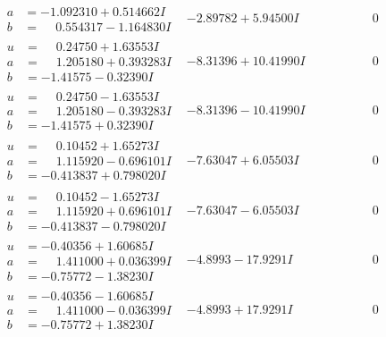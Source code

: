 \documentclass[1p]{elsarticle_modified}
\theoremstyle{definition}
\begin{document}
$$\begin{array}{c|c|c}
\begin{aligned}
a &= -1.092310 + 0.514662 I \\
b &= \phantom{-}0.554317 - 1.164830 I\end{aligned}
 & -2.89782 + 5.94500 I & \phantom{-0.000000 } 0 \\ \hline\begin{aligned}
u &= \phantom{-}0.24750 + 1.63553 I \\
a &= \phantom{-}1.205180 + 0.393283 I \\
b &= -1.41575 - 0.32390 I\end{aligned}
 & -8.31396 + 10.41990 I & \phantom{-0.000000 } 0 \\ \hline\begin{aligned}
u &= \phantom{-}0.24750 - 1.63553 I \\
a &= \phantom{-}1.205180 - 0.393283 I \\
b &= -1.41575 + 0.32390 I\end{aligned}
 & -8.31396 - 10.41990 I & \phantom{-0.000000 } 0 \\ \hline\begin{aligned}
u &= \phantom{-}0.10452 + 1.65273 I \\
a &= \phantom{-}1.115920 - 0.696101 I \\
b &= -0.413837 + 0.798020 I\end{aligned}
 & -7.63047 + 6.05503 I & \phantom{-0.000000 } 0 \\ \hline\begin{aligned}
u &= \phantom{-}0.10452 - 1.65273 I \\
a &= \phantom{-}1.115920 + 0.696101 I \\
b &= -0.413837 - 0.798020 I\end{aligned}
 & -7.63047 - 6.05503 I & \phantom{-0.000000 } 0 \\ \hline\begin{aligned}
u &= -0.40356 + 1.60685 I \\
a &= \phantom{-}1.411000 + 0.036399 I \\
b &= -0.75772 - 1.38230 I\end{aligned}
 & -4.8993 - 17.9291 I & \phantom{-0.000000 } 0 \\ \hline\begin{aligned}
u &= -0.40356 - 1.60685 I \\
a &= \phantom{-}1.411000 - 0.036399 I \\
b &= -0.75772 + 1.38230 I\end{aligned}
 & -4.8993 + 17.9291 I & \phantom{-0.000000 } 0 \\ \hline\begin{aligned}

\end{aligned}
\end{array}$$
\end{document}
